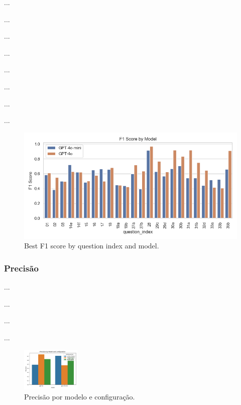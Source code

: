                 ...

                ...

                ...

                ...
                

                ...

                ...

                ...
                
                ...

                
                \begin{figure}
                    \centering
                    \includegraphics[width=1\linewidth]{images_exp2/best_f1_by_question_index_and_model.png}
                    \caption{Best F1 score by question index and model.}
                    \label{fig:best_f1_by_question_index_and_model}
                \end{figure}


            \subsubsection{Precisão}

                ...

                ...

                ...

                ...

                \begin{figure}[h!]
                    \centering              
                    \includegraphics[width=0.25\textwidth]{images_part_2/model_precision_model_configuration.png}
                    \caption{Precisão por modelo e configuração.}
                    \label{fig:model_precision_model_configuration}
                \end{figure}
                

